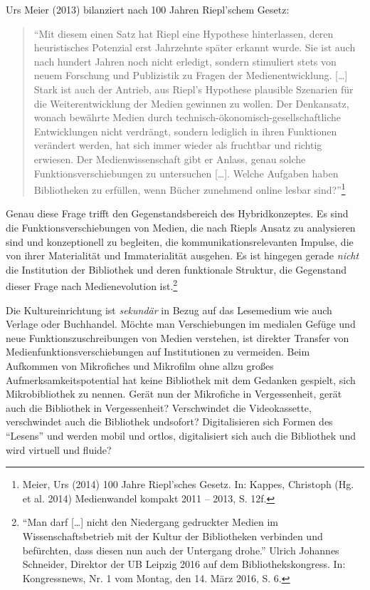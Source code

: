 \documentclass[a4paper,
fontsize=11pt,
oneside,
numbers=noperiodatend,
parskip=half-,
bibliography=totoc,
final
]{scrartcl}
\begin{document}
Urs Meier (2013) bilanziert nach 100 Jahren Riepl'schem Gesetz:

\begin{quote}
\enquote{Mit diesem einen Satz hat Riepl eine Hypothese hinterlassen,
deren heuristisches Potenzial erst Jahrzehnte später erkannt wurde. Sie
ist auch nach hundert Jahren noch nicht erledigt, sondern stimuliert
stets von neuem Forschung und Publizistik zu Fragen der
Medienentwicklung. {[}\ldots{}{]} Stark ist auch der Antrieb, aus
Riepl's Hypothese plausible Szenarien für die Weiterentwicklung der
Medien gewinnen zu wollen. Der Denkansatz, wonach bewährte Medien durch
technisch-ökonomisch-gesellschaftliche Entwicklungen nicht verdrängt,
sondern lediglich in ihren Funktionen verändert werden, hat sich immer
wieder als fruchtbar und richtig erwiesen. Der Medienwissenschaft gibt
er Anlass, genau solche Funktionsverschiebungen zu untersuchen
{[}\ldots{}{]}. Welche Aufgaben haben Bibliotheken zu erfüllen, wenn
Bücher zunehmend online lesbar sind?}\footnote{Meier, Urs (2014) 100
  Jahre Riepl'sches Gesetz. In: Kappes, Christoph (Hg. et al. 2014)
  Medienwandel kompakt 2011 -- 2013, S. 12f.}
\end{quote}

Genau diese Frage trifft den Gegenstandsbereich des Hybridkonzeptes. Es
sind die Funktionsverschiebungen von Medien, die nach Riepls Ansatz zu
analysieren sind und konzeptionell zu begleiten, die
kommunikationsrelevanten Impulse, die von ihrer Materialität und
Immaterialität ausgehen. Es ist hingegen gerade \emph{nicht} die
Institution der Bibliothek und deren funktionale Struktur, die
Gegenstand dieser Frage nach Medienevolution ist.\footnote{\enquote{Man
  darf {[}\ldots{}{]} nicht den Niedergang gedruckter Medien im
  Wissenschaftsbetrieb mit der Kultur der Bibliotheken verbinden und
  befürchten, dass diesen nun auch der Untergang drohe.} Ulrich Johannes
  Schneider, Direktor der UB Leipzig 2016 auf dem Bibliothekskongress.
  In: Kongressnews, Nr. 1 vom Montag, den 14. März 2016, S. 6.}

Die Kultureinrichtung ist \emph{sekundär} in Bezug auf das Lesemedium
wie auch Verlage oder Buchhandel. Möchte man Verschiebungen im medialen
Gefüge und neue Funktionszuschreibungen von Medien verstehen, ist
direkter Transfer von Medienfunktionsverschiebungen auf Institutionen zu
vermeiden. Beim Aufkommen von Mikrofiches und Mikrofilm ohne allzu
großes Aufmerksamkeitspotential hat keine Bibliothek mit dem Gedanken
gespielt, sich Mikrobibliothek zu nennen. Gerät nun der Mikrofiche in
Vergessenheit, gerät auch die Bibliothek in Vergessenheit? Verschwindet
die Videokassette, verschwindet auch die Bibliothek undsofort?
Digitalisieren sich Formen des \enquote{Lesens} und werden mobil und
ortlos, digitalisiert sich auch die Bibliothek und wird virtuell und
fluide?
\end{document}
